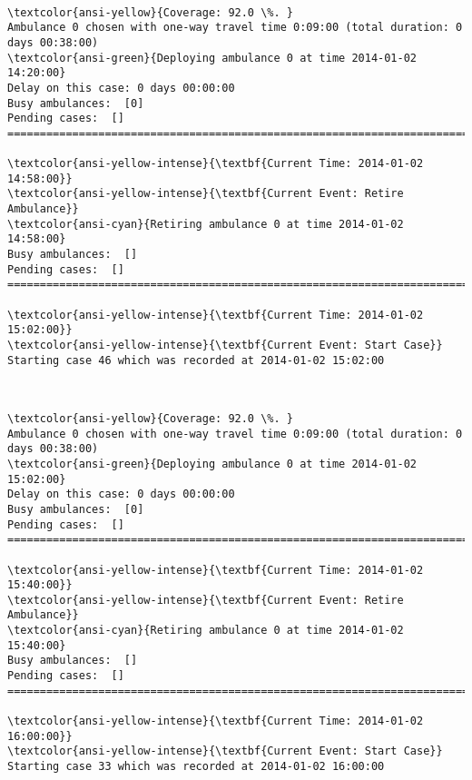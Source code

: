\documentclass[11pt]{article}
\begin{document}
    \begin{center}
    \end{center}
    { \hspace*{\fill} \\}
    
    \begin{Verbatim}[commandchars=\\\{\}]
\textcolor{ansi-yellow}{Coverage: 92.0 \%. }
Ambulance 0 chosen with one-way travel time 0:09:00 (total duration: 0 days 00:38:00)
\textcolor{ansi-green}{Deploying ambulance 0 at time 2014-01-02 14:20:00}
Delay on this case: 0 days 00:00:00
Busy ambulances:  [0]
Pending cases:  []
========================================================================

\textcolor{ansi-yellow-intense}{\textbf{Current Time: 2014-01-02 14:58:00}}
\textcolor{ansi-yellow-intense}{\textbf{Current Event: Retire Ambulance}}
\textcolor{ansi-cyan}{Retiring ambulance 0 at time 2014-01-02 14:58:00}
Busy ambulances:  []
Pending cases:  []
========================================================================

\textcolor{ansi-yellow-intense}{\textbf{Current Time: 2014-01-02 15:02:00}}
\textcolor{ansi-yellow-intense}{\textbf{Current Event: Start Case}}
Starting case 46 which was recorded at 2014-01-02 15:02:00

    \end{Verbatim}

    \begin{center}
    \end{center}
    { \hspace*{\fill} \\}
    
    \begin{Verbatim}[commandchars=\\\{\}]
\textcolor{ansi-yellow}{Coverage: 92.0 \%. }
Ambulance 0 chosen with one-way travel time 0:09:00 (total duration: 0 days 00:38:00)
\textcolor{ansi-green}{Deploying ambulance 0 at time 2014-01-02 15:02:00}
Delay on this case: 0 days 00:00:00
Busy ambulances:  [0]
Pending cases:  []
========================================================================

\textcolor{ansi-yellow-intense}{\textbf{Current Time: 2014-01-02 15:40:00}}
\textcolor{ansi-yellow-intense}{\textbf{Current Event: Retire Ambulance}}
\textcolor{ansi-cyan}{Retiring ambulance 0 at time 2014-01-02 15:40:00}
Busy ambulances:  []
Pending cases:  []
========================================================================

\textcolor{ansi-yellow-intense}{\textbf{Current Time: 2014-01-02 16:00:00}}
\textcolor{ansi-yellow-intense}{\textbf{Current Event: Start Case}}
Starting case 33 which was recorded at 2014-01-02 16:00:00

    \end{Verbatim}
\end{document}

